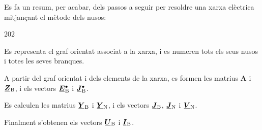 Es fa un resum, per acabar, dels passos a seguir per resoldre una
xarxa elèctrica mitjançant el mètode dels nusos:
\begin{dingautolist}{202}
   \item Es representa el graf orientat associat a la xarxa, i es numeren tots els seus nusos i totes les seves branques.
   \item A partir del graf orientat i dels elements de la xarxa, es formen les matrius $\boldsymbol{A}$ i $\mcmplx{Z}\ped{B}$, i els vectors $\mcmplx{E}\ped{B}^\bullet$ i $\mcmplx{J}\ped{B}^\bullet$.
   \item Es calculen les matrius $\mcmplx{Y}\ped{B}$ i $\mcmplx{Y}\ped{N}$, i els vectors $\mcmplx{J}\ped{B}$,  $\mcmplx{J}\ped{N}$ i $\mcmplx{V}\ped{N}$.
   \item Finalment s'obtenen els vectors  $\mcmplx{U}\ped{B}$ i $\mcmplx{I}\ped{B}$.
\end{dingautolist}


